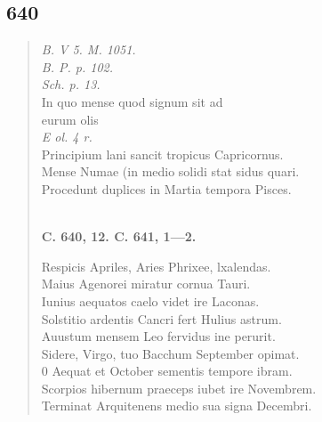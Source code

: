 \documentclass[11pt, a4paper]{report}
\begin{document}
            \subsection*{640}
      \begin{verse}
      \textit{B. V 5. M. 1051.} \\ \textit{B. P. p. 102.} \\ \textit{Sch. p. 13.} \\ In quo mense quod signum sit ad \\ eurum olis \\ \textit{E ol. 4 r.} \\ Principium lani sancit tropicus Capricornus. \\ Mense Numae (in medio solidi stat sidus quari. \\ Procedunt duplices in Martia tempora Pisces. \\ 
        ﻿\pagebreak 
    \begin{center} \textbf{C. 640, 12. C. 641, 1—2.} \end{center} \marginpar{[107]} Respicis Apriles, Aries Phrixee, lxalendas. \\ Maius Agenorei miratur cornua Tauri. \\ Iunius aequatos caelo videt ire Laconas. \\ Solstitio ardentis Cancri fert Hulius astrum. \\ Auustum mensem Leo fervidus ine perurit. \\ Sidere, Virgo, tuo Bacchum September opimat. \\ 0 Aequat et October sementis tempore ibram. \\ Scorpios hibernum praeceps iubet ire Novembrem. \\ Terminat Arquitenens medio sua signa Decembri. \\ 
      \end{verse}
  
\end{document}
